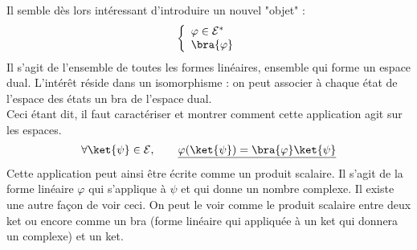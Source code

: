 Il semble dès lors intéressant d'introduire un nouvel "objet" : 
\begin{equation}
\left\{\begin{array}{ll}
\varphi \in \mathcal{E}^*\\
\bra{\varphi}
\end{array}\right.
\end{equation}
Il s'agit de l'ensemble de toutes les formes linéaires, ensemble qui forme un espace dual. 
L'intérêt réside dans un isomorphisme : on peut associer à chaque état de l'espace des états 
un bra de l'espace dual.\\

Ceci étant dit, il faut caractériser et montrer comment cette application agit sur les espaces. 
\begin{equation}
\forall \ket{\psi} \in \mathcal{E},\qquad \underline{\varphi(\ket{\psi}) =\bra{\varphi}\ket{\psi}}
\end{equation}
Cette application peut ainsi être écrite comme un produit scalaire. Il s'agit de la forme 
linéaire $\varphi$ qui s'applique à $\psi$ et qui donne un nombre complexe. Il existe une 
autre façon de voir ceci. On peut le voir comme le produit scalaire entre deux ket ou encore 
comme un bra (forme linéaire qui appliquée à un ket qui donnera un complexe) et un ket.\\
 
